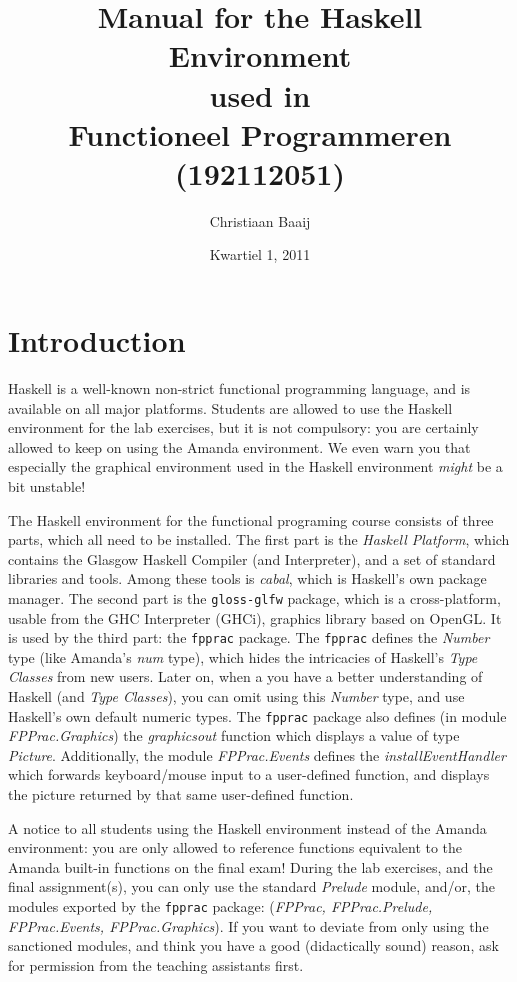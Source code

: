 \documentclass[]{article}
\title{Manual for the Haskell Environment \\ used in \\ Functioneel Programmeren (192112051)}
\author{Christiaan Baaij}
\date{Kwartiel 1, 2011}
\begin{document}

\maketitle

\section{Introduction}
Haskell is a well-known non-strict functional programming language, and is available on all major platforms.
Students are allowed to use the Haskell environment for the lab exercises, but it is not compulsory: you are certainly allowed to keep on using the Amanda environment.
We even warn you that especially the graphical environment used in the Haskell environment \emph{might} be a bit unstable!

The Haskell environment for the functional programing course consists of three parts, which all need to be installed.
The first part is the \emph{Haskell Platform}, which contains the Glasgow Haskell Compiler (and Interpreter), and a set of standard libraries and tools. 
Among these tools is \emph{cabal}, which is Haskell's own package manager. The second part is the \texttt{gloss-glfw} package, which is a cross-platform, usable from the GHC Interpreter (GHCi), graphics library based on OpenGL.
It is used by the third part: the \texttt{fpprac} package. The \texttt{fpprac} defines the \emph{Number} type (like Amanda's \emph{num} type), which hides the intricacies of Haskell's \emph{Type Classes} from new users.
Later on, when a you have a better understanding of Haskell (and \emph{Type Classes}), you can omit using this \emph{Number} type, and use Haskell's own default numeric types.
The \texttt{fpprac} package also defines (in module \emph{FPPrac.Graphics}) the \emph{graphicsout} function which displays a value of type \emph{Picture}. Additionally, the module \emph{FPPrac.Events} defines the \emph{installEventHandler} which forwards keyboard/mouse input to a user-defined function, and displays the picture returned by that same user-defined function.

A notice to all students using the Haskell environment instead of the Amanda environment: you are only allowed to reference functions equivalent to the Amanda built-in functions on the final exam! 
During the lab exercises, and the final assignment(s), you can only use the standard \emph{Prelude} module, and/or, the modules exported by the \texttt{fpprac} package: (\emph{FPPrac, FPPrac.Prelude, FPPrac.Events, FPPrac.Graphics}).
If you want to deviate from only using the sanctioned modules, and think you have a good (didactically sound) reason, ask for permission from the teaching assistants first.
\end{document}
